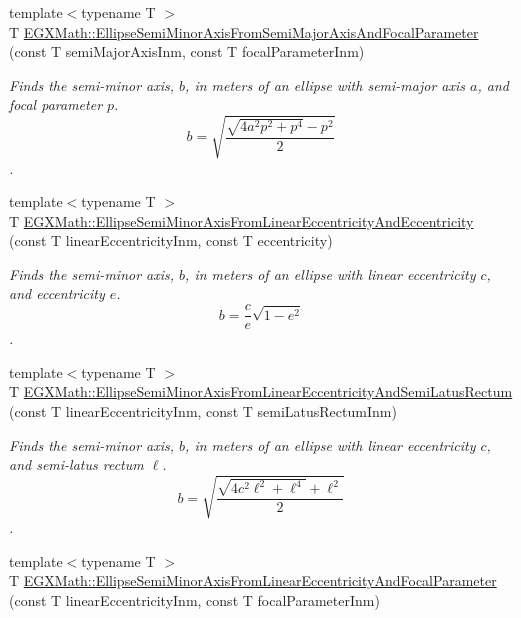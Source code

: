 \begin{DoxyCompactItemize}
{\footnotesize template$<$typename T $>$ }\\T \mbox{\hyperlink{group___e_g_x_math-_geometry-2_d-_ellipse-_semi_minor_axis_ga49cd1c9a110ae740e606d1f012edf037}{E\+G\+X\+Math\+::\+Ellipse\+Semi\+Minor\+Axis\+From\+Semi\+Major\+Axis\+And\+Focal\+Parameter}} (const T semi\+Major\+Axis\+Inm, const T focal\+Parameter\+Inm)
\begin{DoxyCompactList}\small\item\em Finds the semi-\/minor axis, $b$, in meters of an ellipse with semi-\/major axis $a$, and focal parameter $p$. \[ b=\sqrt{\dfrac{\sqrt{4 a^2 p^2 + p^4}-p^2}{2}} \]. \end{DoxyCompactList}\item 
{\footnotesize template$<$typename T $>$ }\\T \mbox{\hyperlink{group___e_g_x_math-_geometry-2_d-_ellipse-_semi_minor_axis_ga7d19bfb56b8d9678c8ff7c843e1ae3b6}{E\+G\+X\+Math\+::\+Ellipse\+Semi\+Minor\+Axis\+From\+Linear\+Eccentricity\+And\+Eccentricity}} (const T linear\+Eccentricity\+Inm, const T eccentricity)
\begin{DoxyCompactList}\small\item\em Finds the semi-\/minor axis, $b$, in meters of an ellipse with linear eccentricity $c$, and eccentricity $e$. \[ b=\dfrac{c}{e}\sqrt{1 - e^2}\]. \end{DoxyCompactList}\item 
{\footnotesize template$<$typename T $>$ }\\T \mbox{\hyperlink{group___e_g_x_math-_geometry-2_d-_ellipse-_semi_minor_axis_gac4b0e45f43bee20fc64bbdd421ebc956}{E\+G\+X\+Math\+::\+Ellipse\+Semi\+Minor\+Axis\+From\+Linear\+Eccentricity\+And\+Semi\+Latus\+Rectum}} (const T linear\+Eccentricity\+Inm, const T semi\+Latus\+Rectum\+Inm)
\begin{DoxyCompactList}\small\item\em Finds the semi-\/minor axis, $b$, in meters of an ellipse with linear eccentricity $c$, and semi-\/latus rectum $\ell$. \[ b=\sqrt{\dfrac{\sqrt{4 c^2 \ell^2+ \ell^4}+\ell^2}{2}}\]. \end{DoxyCompactList}\item 
{\footnotesize template$<$typename T $>$ }\\T \mbox{\hyperlink{group___e_g_x_math-_geometry-2_d-_ellipse-_semi_minor_axis_ga03cbc96729f84c9691bf1c5bfcc6b083}{E\+G\+X\+Math\+::\+Ellipse\+Semi\+Minor\+Axis\+From\+Linear\+Eccentricity\+And\+Focal\+Parameter}} (const T linear\+Eccentricity\+Inm, const T focal\+Parameter\+Inm)

\end{DoxyCompactItemize}
